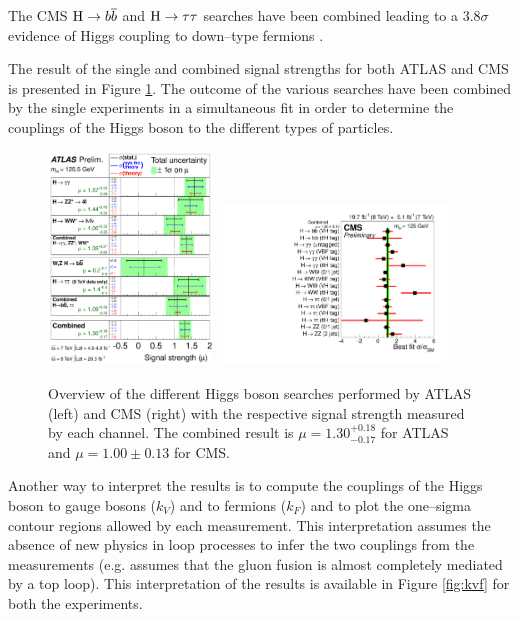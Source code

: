 The CMS $\mathrm{H} \rightarrow b\overline{b}$ and $\mathrm{H} \rightarrow \tau \tau$ searches have been combined leading to a $3.8\sigma$ evidence of Higgs coupling to down--type fermions \cite{Chatrchyan:2014vua}.

The result of the single and combined signal strengths for both ATLAS \cite{ATLASCONF:2014009} and CMS \cite{CMS:2014ega} is presented in Figure \ref{fig:combination}.
The outcome of the various searches have been combined by the single experiments in a simultaneous fit in order to determine the couplings of the Higgs boson to the different types of particles. 

\begin{figure}
        \centering
	\includegraphics[width=0.39\textwidth]{1_Introduction_Th_and_Exp/pics/fig_01.pdf}
	\includegraphics[width=0.54\textwidth]{1_Introduction_Th_and_Exp/pics/sqr_mlz_ccc_mH125.pdf}
       \caption{Overview of the different Higgs boson searches performed by ATLAS (left) and CMS (right) with the respective signal strength measured by each channel. The combined result is $\mu = 1.30^{+0.18}_{-0.17}$ for ATLAS and $\mu = 1.00 \pm 0.13$ for CMS.}
       \label{fig:combination}
\end{figure}

Another way to interpret the results is to compute the couplings of the Higgs boson to gauge bosons ($k_V$) and to fermions ($k_F$) and to plot the one--sigma contour regions allowed by each measurement. This interpretation assumes the absence of new physics in loop processes to infer the two couplings from the measurements (e.g. assumes that the gluon fusion is almost completely mediated by a top loop). This interpretation of the results is available in Figure \ref{fig:kvf} for both the experiments.

